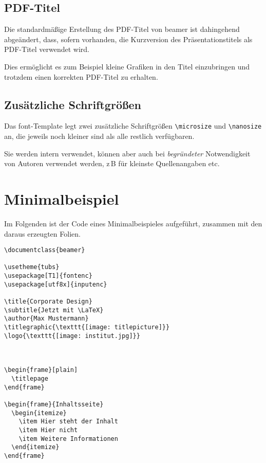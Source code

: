\subsection{PDF-Titel}

Die standardmäßige Erstellung des PDF-Titel von beamer ist dahingehend
abgeändert, dass, sofern vorhanden, die Kurzversion des Präsentationstitels
als PDF-Titel verwendet wird.

Dies ermöglicht es zum Beispiel kleine Grafiken in den Titel einzubringen und
trotzdem einen korrekten PDF-Titel zu erhalten.


\subsection{Zusätzliche Schriftgrößen}

Das font-Template legt zwei zusätzliche Schriftgrößen \lstinline{\microsize}
und \lstinline{\nanosize} an, die jeweils noch kleiner sind als alle restlich
verfügbaren.

Sie werden intern verwendet, können aber auch bei \emph{begründeter}
Notwendigkeit von Autoren verwendet werden, z\,B für kleinste Quellenangaben
etc.


\section{Minimalbeispiel}%

Im Folgenden ist der Code eines Minimalbeispieles aufgeführt, zusammen mit den
daraus erzeugten Folien.

\begin{verbatim}
\documentclass{beamer}

\usetheme{tubs}
\usepackage[T1]{fontenc}
\usepackage[utf8x]{inputenc}

\title{Corporate Design}
\subtitle{Jetzt mit \LaTeX}
\author{Max Mustermann}
\titlegraphic{\texttt{[image: titlepicture]}}
\logo{\texttt{[image: institut.jpg]}}



\begin{frame}[plain]
  \titlepage
\end{frame}

\begin{frame}{Inhaltsseite}
  \begin{itemize}
    \item Hier steht der Inhalt
    \item Hier nicht
    \item Weitere Informationen
  \end{itemize}
\end{frame}


\end{verbatim}

\begin{center}

\end{center}
